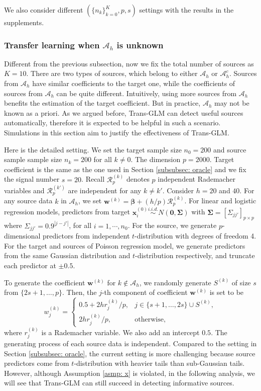 \documentclass[12pt]{article}
\newcommand{\bbeta}{\bm{\beta}}
\newcommand{\bx}{\bm{x}}
\newcommand{\bw}{\bm{w}}
\newcommand{\bwk}[1]{\bm{w}^{(#1)}}
\newcommand{\mah}{\mathcal{A}_h}
\newcommand{\<}{\langle}
\renewcommand{\>}{\rangle}
\begin{document}
We also consider different $(\{n_k\}_{k=0}^K, p, s)$ settings with the results in the supplements. 



\subsubsection{Transfer learning when $\mah$ is unknown}\label{subsubsec: unknown simulation}
Different from the previous subsection, now we fix the total number of sources as $K = 10$. There are two types of sources, which belong to either $\mah$ or $\mah^c$. Sources from $\mah$ have similar coefficients to the target one, while the coefficients of sources from $\mah$ can be quite different. Intuitively, using more sources from $\mah$ benefits the estimation of the target coefficient. But in practice, $\mah$ may not be known as a priori. As we argued before, Trans-GLM can detect useful sources automatically, therefore it is expected to be helpful in such a scenario. Simulations in this section aim to justify the effectiveness of Trans-GLM.

Here is the detailed setting. We set the target sample size $n_0 = 200$ and source sample sample size $n_k = 200$ for all $k \neq 0$. The dimension $p = 2000$. Target coefficient is the same as the one used in Section \ref{subsubsec: oracle} and we fix the signal number $s = 20$. Recall $\bm{\mathscr{R}}_p^{(k)}$ denotes $p$ independent Rademacher variables and $\bm{\mathscr{R}}_p^{(k')}$ are independent for any $k \neq k'$. Consider $h = 20$ and $40$. For any source data $k$ in $\mah$, we set $\bwk{k} = \bbeta + (h/p)\bm{\mathscr{R}}_p^{(k)}$. For linear and logistic regression models, predictors from target $\bx^{(0)}_i \overset{i.i.d.}{\sim} N(\bm{0}, \bm{\Sigma})$ with $\bm{\Sigma} = [\Sigma_{jj'}]_{p \times p}$ where $\Sigma_{jj'}=0.9^{|j-j'|}$, for all $i=1,\cdots, n_0$. For the source, we generate $p$-dimensional predictors from independent $t$-distribution with degrees of freedom 4. For the target and sources of Poisson regression model, we generate predictors from the same Gaussian distribution and $t$-distribution respectively, and truncate each predictor at $\pm 0.5$. 

To generate the coefficient $\bwk{k}$ for $k \notin \mah$, we randomly generate $S^{(k)}$ of size $s$ from $\{2s+1, \ldots, p\}$. Then, the $j$-th component of coefficient $\bw^{(k)}$ is set to be 
\begin{equation}
	w^{(k)}_j = \begin{cases}
		0.5 + 2hr_j^{(k)}/p, & j \in \{s+1, \ldots, 2s\}\cup S^{(k)},\\
		2hr_j^{(k)}/p, & \textrm{otherwise},
	\end{cases}
\end{equation}
where $r_j^{(k)}$ is a Rademacher variable. We also add an intercept $0.5$. The generating process of each source data is independent. Compared to the setting in Section \ref{subsubsec: oracle}, the current setting is more challenging because source predictors come from $t$-distribution with heavier tails than sub-Gaussian tails. However, although Assumption \ref{asmp: x} is violated, in the following analysis, we will see that Trans-GLM can still succeed in detecting informative sources.
\end{document}
